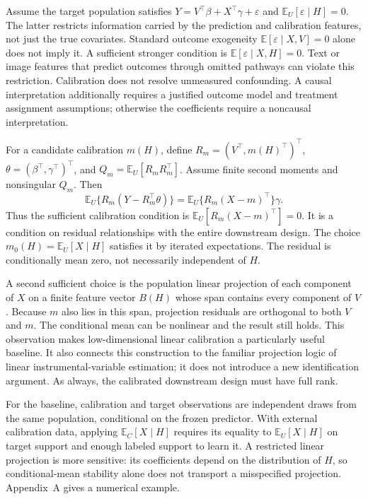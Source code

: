 \documentclass[11pt]{article}
\newcommand{\E}{\mathbb{E}}
\begin{document}
Assume the target population satisfies $Y=V^\top\beta+X^\top\gamma+\varepsilon$ and $\E_U[\varepsilon\mid H]=0$. The latter restricts information carried by the prediction and calibration features, not just the true covariates. Standard outcome exogeneity $\E[\varepsilon\mid X,V]=0$ alone does not imply it. A sufficient stronger condition is $\E[\varepsilon\mid X,H]=0$. Text or image features that predict outcomes through omitted pathways can violate this restriction. Calibration does not resolve unmeasured confounding. A causal interpretation additionally requires a justified outcome model and treatment assignment assumptions; otherwise the coefficients require a noncausal interpretation.

For a candidate calibration $m(H)$, define $R_m=(V^\top,m(H)^\top)^\top$, $\theta=(\beta^\top,\gamma^\top)^\top$, and $Q_m=\E_U[R_mR_m^\top]$. Assume finite second moments and nonsingular $Q_m$. Then
\begin{equation}\label{eq:identity}
\E_U\{R_m(Y-R_m^\top\theta)\}
 =\E_U\{R_m(X-m)^\top\}\gamma.
\end{equation}
Thus the sufficient calibration condition is $\E_U[R_m(X-m)^\top]=0$. It is a condition on residual relationships with the entire downstream design. The choice $m_0(H)=\E_U[X\mid H]$ satisfies it by iterated expectations. The residual is conditionally mean zero, not necessarily independent of $H$.

A second sufficient choice is the population linear projection of each component of $X$ on a finite feature vector $B(H)$ whose span contains every component of $V$. Because $m$ also lies in this span, projection residuals are orthogonal to both $V$ and $m$. The conditional mean can be nonlinear and the result still holds. This observation makes low-dimensional linear calibration a particularly useful baseline. It also connects this construction to the familiar projection logic of linear instrumental-variable estimation; it does not introduce a new identification argument. As always, the calibrated downstream design must have full rank.

For the baseline, calibration and target observations are independent draws from the same population, conditional on the frozen predictor. With external calibration data, applying $\E_C[X\mid H]$ requires its equality to $\E_U[X\mid H]$ on target support and enough labeled support to learn it. A restricted linear projection is more sensitive: its coefficients depend on the distribution of $H$, so conditional-mean stability alone does not transport a misspecified projection. Appendix~A gives a numerical example.
\end{document}

